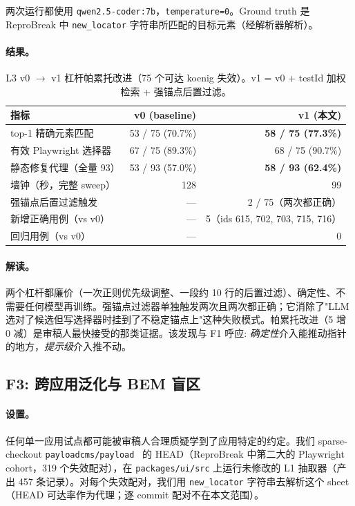 两次运行都使用 \texttt{qwen2.5-coder:7b}，\texttt{temperature=0}。Ground truth 是 ReproBreak 中 \texttt{new\_locator} 字符串所匹配的目标元素（经解析器解析）。

\paragraph{结果。}
\begin{table}[t]
\centering
\caption{L3 v0 $\to$ v1 杠杆帕累托改进（75 个可达 koenig 失效）。v1 = v0 + testId 加权检索 + 强锚点后置过滤。}
\label{tab:l3-levers}
\small
\begin{tabular}{lrr}
\toprule
指标 & v0 (baseline) & v1 (本文) \\
\midrule
top-1 精确元素匹配 & 53 / 75 (70.7\%) & \textbf{58 / 75 (77.3\%)} \\
有效 Playwright 选择器 & 67 / 75 (89.3\%) & 68 / 75 (90.7\%) \\
静态修复代理（全量 93） & 53 / 93 (57.0\%) & \textbf{58 / 93 (62.4\%)} \\
墙钟（秒，完整 sweep） & 128 & 99 \\
\midrule
强锚点后置过滤触发 & --- & 2 / 75（两次都正确） \\
新增正确用例（vs v0） & --- & 5（ids 615, 702, 703, 715, 716） \\
回归用例（vs v0） & --- & 0 \\
\bottomrule
\end{tabular}
\end{table}

\paragraph{解读。}
两个杠杆都廉价（一次正则优先级调整、一段约 10 行的后置过滤）、确定性、不需要任何模型再训练。强锚点过滤器单独触发两次且两次都正确；它消除了"LLM 选对了候选但写选择器时挂到了不稳定锚点上"这种失败模式。帕累托改进（5 增 0 减）是审稿人最快接受的那类证据。该发现与 F1 呼应: \emph{确定性}介入能推动指针的地方，\emph{提示级}介入推不动。

\subsection{F3: 跨应用泛化与 BEM 盲区}
\label{sec:f3}

\paragraph{设置。}
任何单一应用试点都可能被审稿人合理质疑学到了应用特定的约定。我们 sparse-checkout \texttt{payloadcms/payload}~\cite{payloadCMS} 的 HEAD（ReproBreak 中第二大的 Playwright cohort，319 个失效配对），在 \texttt{packages/ui/src} 上运行未修改的 L1 抽取器（产出 457 条记录）。对每个失效配对，我们用 \texttt{new\_locator} 字符串去解析这个 sheet（HEAD 可达率作为代理；逐 commit 配对不在本文范围）。

